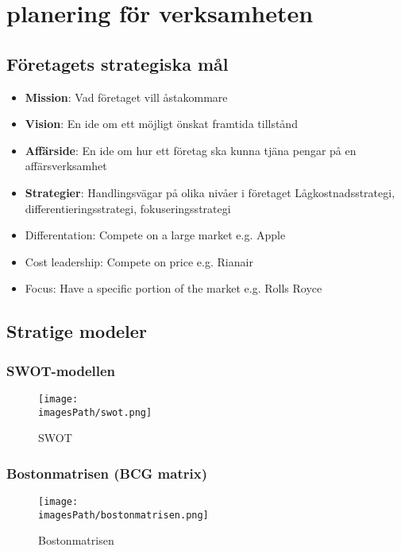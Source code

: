 \section{planering för verksamheten}
\subsection{Företagets strategiska mål}
\begin{itemize}
    \item \textbf{Mission}: \newline
    Vad företaget vill åstakommare
    \item \textbf{Vision}: \newline
    En ide om ett möjligt önskat framtida tillstånd
    \item \textbf{Affärside}: \newline
    En ide om hur ett företag ska kunna tjäna pengar på en affärsverksamhet
    \item \textbf{Strategier}: \newline 
    Handlingsvägar på olika nivåer i företaget \newline
    Lågkostnadsstrategi, differentieringsstrategi, fokuseringsstrategi
\end{itemize}

\begin{itemize}
    \item Differentation: Compete on a large market e.g. Apple
    \item Cost leadership: Compete on price e.g. Rianair
    \item Focus: Have a specific portion of the market e.g. Rolls Royce
\end{itemize}

\newpage
\subsection{Stratige modeler}
\subsubsection{SWOT-modellen}
\begin{figure}[!h]
    \centering
    \texttt{[image: \\imagesPath/swot.png]}
    \caption{SWOT}
\end{figure}

\subsubsection{Bostonmatrisen (BCG matrix)}
\begin{figure}[!h]
    \centering
    \texttt{[image: \\imagesPath/bostonmatrisen.png]}
    \caption{Bostonmatrisen}
\end{figure}

